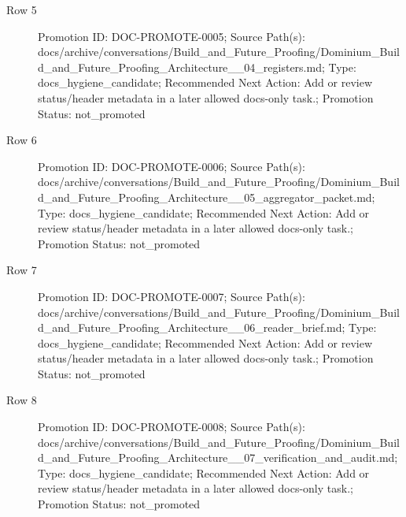\documentclass[10.5pt,a4paper,openany]{book}
\begin{document}
\begin{description}
\item[Row 5] Promotion ID: DOC-\allowbreak{}PROMOTE-\allowbreak{}0005; Source Path(s): docs/\allowbreak{}archive/\allowbreak{}conversations/\allowbreak{}Build\_\allowbreak{}and\_\allowbreak{}Future\_\allowbreak{}Proofing/\allowbreak{}Dominium\_\allowbreak{}Build\_\allowbreak{}and\_\allowbreak{}Future\_\allowbreak{}Proofing\_\allowbreak{}Architecture\_\allowbreak{}\_\allowbreak{}04\_\allowbreak{}registers.\allowbreak{}md; Type: docs\_\allowbreak{}hygiene\_\allowbreak{}candidate; Recommended Next Action: Add or review status/\allowbreak{}header metadata in a later allowed docs-\allowbreak{}only task.\allowbreak{}; Promotion Status: not\_\allowbreak{}promoted
\item[Row 6] Promotion ID: DOC-\allowbreak{}PROMOTE-\allowbreak{}0006; Source Path(s): docs/\allowbreak{}archive/\allowbreak{}conversations/\allowbreak{}Build\_\allowbreak{}and\_\allowbreak{}Future\_\allowbreak{}Proofing/\allowbreak{}Dominium\_\allowbreak{}Build\_\allowbreak{}and\_\allowbreak{}Future\_\allowbreak{}Proofing\_\allowbreak{}Architecture\_\allowbreak{}\_\allowbreak{}05\_\allowbreak{}aggregator\_\allowbreak{}packet.\allowbreak{}md; Type: docs\_\allowbreak{}hygiene\_\allowbreak{}candidate; Recommended Next Action: Add or review status/\allowbreak{}header metadata in a later allowed docs-\allowbreak{}only task.\allowbreak{}; Promotion Status: not\_\allowbreak{}promoted
\item[Row 7] Promotion ID: DOC-\allowbreak{}PROMOTE-\allowbreak{}0007; Source Path(s): docs/\allowbreak{}archive/\allowbreak{}conversations/\allowbreak{}Build\_\allowbreak{}and\_\allowbreak{}Future\_\allowbreak{}Proofing/\allowbreak{}Dominium\_\allowbreak{}Build\_\allowbreak{}and\_\allowbreak{}Future\_\allowbreak{}Proofing\_\allowbreak{}Architecture\_\allowbreak{}\_\allowbreak{}06\_\allowbreak{}reader\_\allowbreak{}brief.\allowbreak{}md; Type: docs\_\allowbreak{}hygiene\_\allowbreak{}candidate; Recommended Next Action: Add or review status/\allowbreak{}header metadata in a later allowed docs-\allowbreak{}only task.\allowbreak{}; Promotion Status: not\_\allowbreak{}promoted
\item[Row 8] Promotion ID: DOC-\allowbreak{}PROMOTE-\allowbreak{}0008; Source Path(s): docs/\allowbreak{}archive/\allowbreak{}conversations/\allowbreak{}Build\_\allowbreak{}and\_\allowbreak{}Future\_\allowbreak{}Proofing/\allowbreak{}Dominium\_\allowbreak{}Build\_\allowbreak{}and\_\allowbreak{}Future\_\allowbreak{}Proofing\_\allowbreak{}Architecture\_\allowbreak{}\_\allowbreak{}07\_\allowbreak{}verification\_\allowbreak{}and\_\allowbreak{}audit.\allowbreak{}md; Type: docs\_\allowbreak{}hygiene\_\allowbreak{}candidate; Recommended Next Action: Add or review status/\allowbreak{}header metadata in a later allowed docs-\allowbreak{}only task.\allowbreak{}; Promotion Status: not\_\allowbreak{}promoted

\end{description}
\end{document}
